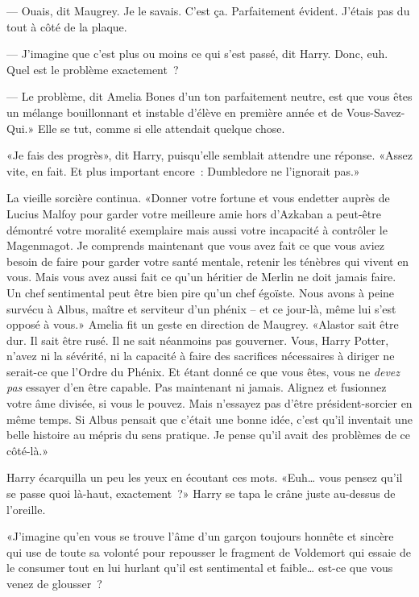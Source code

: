 --- Ouais, dit Maugrey. Je le savais. C'est ça. Parfaitement évident. J'étais pas du tout à côté de la plaque.

--- J'imagine que c'est plus ou moins ce qui s'est passé, dit Harry. Donc, euh. Quel est le problème exactement~?

--- Le problème, dit Amelia Bones d'un ton parfaitement neutre, est que vous êtes un mélange bouillonnant et instable d'élève en première année et de Vous-Savez-Qui.» Elle se tut, comme si elle attendait quelque chose.

«Je fais des progrès», dit Harry, puisqu'elle semblait attendre une réponse. «Assez vite, en fait. Et plus important encore~: Dumbledore ne l'ignorait pas.»

La vieille sorcière continua. «Donner votre fortune et vous endetter auprès de Lucius Malfoy pour garder votre meilleure amie hors d'Azkaban a peut-être démontré votre moralité exemplaire mais aussi votre incapacité à contrôler le Magenmagot. Je comprends maintenant que vous avez fait ce que vous aviez besoin de faire pour garder votre santé mentale, retenir les ténèbres qui vivent en vous. Mais vous avez aussi fait ce qu'un héritier de Merlin ne doit jamais faire. Un chef sentimental peut être bien pire qu'un chef égoïste. Nous avons à peine survécu à Albus, maître et serviteur d'un phénix -- et ce jour-là, même lui s'est opposé à vous.» Amelia fit un geste en direction de Maugrey. «Alastor sait être dur. Il sait être rusé. Il ne sait néanmoins pas gouverner. Vous, Harry Potter, n'avez ni la sévérité, ni la capacité à faire des sacrifices nécessaires à diriger ne serait-ce que l'Ordre du Phénix. Et étant donné ce que vous êtes, vous ne \emph{devez pas} essayer d'en être capable. Pas maintenant ni jamais. Alignez et fusionnez votre âme divisée, si vous le pouvez. Mais n'essayez pas d'être président-sorcier en même temps. Si Albus pensait que c'était une bonne idée, c'est qu'il inventait une belle histoire au mépris du sens pratique. Je pense qu'il avait des problèmes de ce côté-là.»

Harry écarquilla un peu les yeux en écoutant ces mots. «Euh… vous pensez qu'il se passe quoi là-haut, exactement~?» Harry se tapa le crâne juste au-dessus de l'oreille.

«J'imagine qu'en vous se trouve l'âme d'un garçon toujours honnête et sincère qui use de toute sa volonté pour repousser le fragment de Voldemort qui essaie de le consumer tout en lui hurlant qu'il est sentimental et faible… est-ce que vous venez de glousser~?

